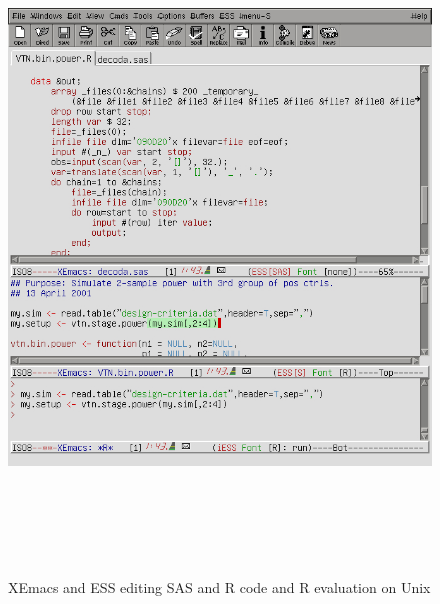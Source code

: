 \documentclass{article}
\begin{document}
\begin{figure}[htbp]
  \begin{center}
    \includegraphics[height=7.0in,width=6.0in]{images/ess-xemacs-fig-1}
    \caption{XEmacs and ESS editing SAS and R code and R evaluation on
      Unix}
    \label{fig:1}
  \end{center}
\end{figure}

\clearpage
\end{document}
